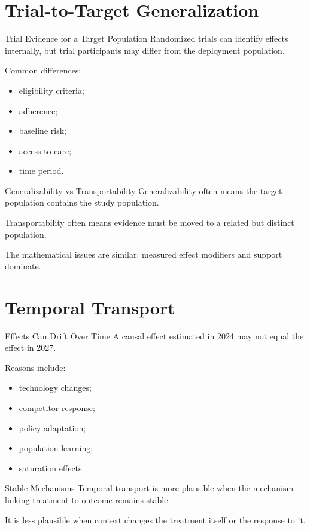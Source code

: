 \documentclass[aspectratio=169,11pt]{beamer}
\begin{document}
\section{Trial-to-Target Generalization}

\begin{frame}{Trial Evidence for a Target Population}
Randomized trials can identify effects internally, but trial participants may differ from the deployment population.

Common differences:
\begin{itemize}
\item eligibility criteria;
\item adherence;
\item baseline risk;
\item access to care;
\item time period.
\end{itemize}
\end{frame}

\begin{frame}{Generalizability vs Transportability}
Generalizability often means the target population contains the study population.

Transportability often means evidence must be moved to a related but distinct population.

The mathematical issues are similar: measured effect modifiers and support dominate.
\end{frame}

\section{Temporal Transport}

\begin{frame}{Effects Can Drift Over Time}
A causal effect estimated in 2024 may not equal the effect in 2027.

Reasons include:
\begin{itemize}
\item technology changes;
\item competitor response;
\item policy adaptation;
\item population learning;
\item saturation effects.
\end{itemize}
\end{frame}

\begin{frame}{Stable Mechanisms}
Temporal transport is more plausible when the mechanism linking treatment to outcome remains stable.

It is less plausible when context changes the treatment itself or the response to it.
\end{frame}
\end{document}

